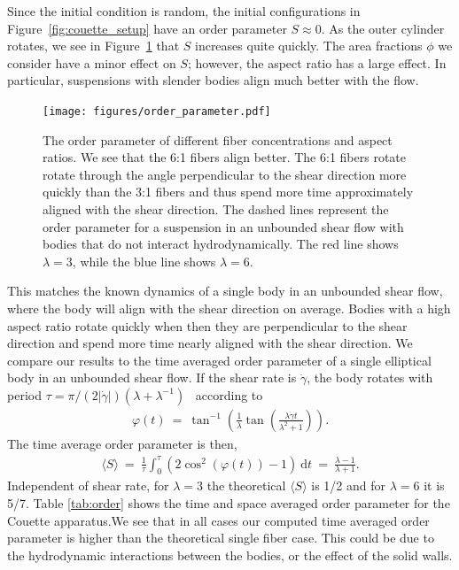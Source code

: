 \documentclass[preprint, 10pt]{elsarticle}
\begin{document}
Since the initial condition is random, the initial configurations in
Figure~\ref{fig:couette_setup} have an order parameter $S\approx 0$. As
the outer cylinder rotates, we see in Figure~\ref{fig:angles} that $S$
increases quite quickly. The area fractions $\phi$ we consider have a
minor effect on $S$; however, the aspect ratio has a large effect.  In
particular, suspensions with slender bodies align much better with the
flow.

\begin{figure}[!h]
\begin{center}
\texttt{[image: figures/order\_parameter.pdf]}\\
\end{center}
\caption{\label{fig:angles} The order parameter of different fiber
concentrations and aspect ratios. We see that the 6:1 fibers align
better. The 6:1 fibers rotate rotate through the angle perpendicular to
the shear direction more quickly than the 3:1 fibers and thus spend more
time approximately aligned with the shear direction. The dashed lines
represent the order parameter for a suspension in an unbounded shear
flow with bodies that do not interact hydrodynamically. The red line
shows $\lambda=3$, while the blue line shows $\lambda=6$. }
\end{figure} 

This matches the known dynamics of a single body in an unbounded shear
flow, where the body will align with the shear direction on
average. Bodies with a high aspect ratio rotate quickly when then they are
perpendicular to the shear direction and spend more time nearly aligned
with the shear direction. We compare our results to the time averaged
order parameter of a single elliptical body in an unbounded shear flow.
If the shear rate is $\dot{\gamma}$, the body rotates with period $\tau
= \pi/(2| \dot{\gamma}|)(\lambda + \lambda^{-1})$~\cite{Jeffery1922}
according to 
\begin{align*}
  \varphi(t) ~=~ \tan^{-1}\left(\frac{1}{\lambda}\tan\left(
    \frac{\lambda \dot{\gamma}t}{\lambda^2 + 1}\right)\right).
\end{align*}
The time average order parameter is then,
\begin{align*}
  \langle S\rangle ~=~ \frac{1}{\tau}\int_0^\tau\left( 
    2\cos^2(\varphi(t)) - 1\right)~\text{d}t ~=~ \frac{\lambda -1}{\lambda+1}.
\end{align*}
Independent of shear rate, for $\lambda= 3$ the theoretical $\langle
S\rangle$ is 1/2 and for $\lambda=6$ it is  5/7. Table \ref{tab:order}
shows the time and space averaged order parameter for the Couette
apparatus.We see that in all cases our computed time averaged order
parameter is higher than the theoretical single fiber case. This could
be due to the hydrodynamic interactions between the bodies, or the
effect of the solid walls.
\end{document}
